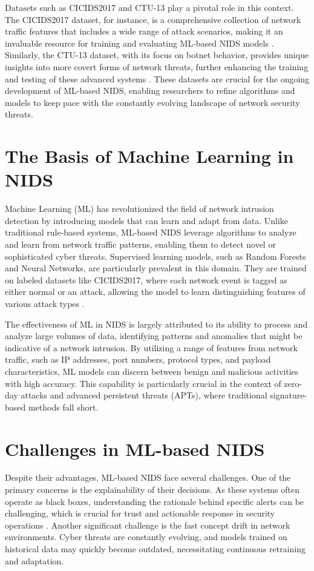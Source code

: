 Datasets such as CICIDS2017 and CTU-13 play a pivotal role in this context. The CICIDS2017 dataset, for instance, 
is a comprehensive collection of network traffic features that includes a wide range of attack scenarios, making it 
an invaluable resource for training and evaluating ML-based NIDS models \cite{cicids2017}. Similarly, the CTU-13 
dataset, with its focus on botnet behavior, provides unique insights into more covert forms of network threats, 
further enhancing the training and testing of these advanced systems \cite{ctu13}. These datasets are crucial for 
the ongoing development of ML-based NIDS, enabling researchers to refine algorithms and models to keep pace with the 
constantly evolving landscape of network security threats.

\section{The Basis of Machine Learning in NIDS}
Machine Learning (ML) has revolutionized the field of network intrusion detection by introducing models that can learn and adapt from data. Unlike traditional rule-based systems, ML-based NIDS leverage algorithms to analyze and learn from network traffic patterns, enabling them to detect novel or sophisticated cyber threats. Supervised learning models, such as Random Forests and Neural Networks, are particularly prevalent in this domain. They are trained on labeled datasets like CICIDS2017, where each network event is tagged as either normal or an attack, allowing the model to learn distinguishing features of various attack types \cite{sharafaldin2018toward}.

The effectiveness of ML in NIDS is largely attributed to its ability to process and analyze large volumes of data, identifying patterns and anomalies that might be indicative of a network intrusion. By utilizing a range of features from network traffic, such as IP addresses, port numbers, protocol types, and payload characteristics, ML models can discern between benign and malicious activities with high accuracy. This capability is particularly crucial in the context of zero-day attacks and advanced persistent threats (APTs), where traditional signature-based methods fall short.

\section{Challenges in ML-based NIDS}
Despite their advantages, ML-based NIDS face several challenges. One of the primary concerns is the explainability of their decisions. As these systems often operate as black boxes, understanding the rationale behind specific alerts can be challenging, which is crucial for trust and actionable response in security operations \cite{garcia2014empirical}. Another significant challenge is the fast concept drift in network environments. Cyber threats are constantly evolving, and models trained on historical data may quickly become outdated, necessitating continuous retraining and adaptation.

